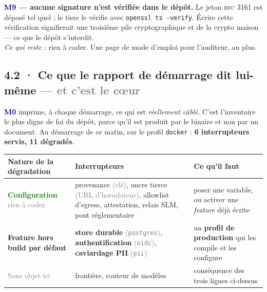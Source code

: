 \documentclass[10pt]{article}
\newcommand{\best}[1]{\textcolor{green}{\textbf{#1}}}
\newcommand{\moyen}[1]{\textcolor{amber}{\textbf{#1}}}
\newcommand{\sz}[1]{\textcolor{grey}{\small\textsf{#1}}}
\newcommand{\code}[1]{\texttt{\small #1}}
\newcommand{\mm}[1]{\textbf{\textcolor{navy}{#1}}}
\begin{document}
\textbf{\mm{M9} --- aucune signature n'est vérifiée dans le dépôt.} Le jeton \textsc{rfc 3161} est
déposé tel quel ; le tiers le vérifie avec \code{openssl ts -verify}. Écrire cette vérification
signifierait une troisième pile cryptographique et de la crypto maison --- ce que le dépôt s'interdit.
\\ \emph{Ce qui reste} : rien à coder. Une page de mode d'emploi pour l'auditeur, au plus.

\subsection{4.2 · Ce que le rapport de démarrage dit lui-même \sz{--- et c'est le cœur}}

\mm{M0} imprime, à chaque démarrage, ce qui est \emph{réellement câblé}. C'est l'inventaire le plus
digne de foi du dépôt, parce qu'il est produit par le binaire et non par un document. Au démarrage
de ce matin, sur le profil \code{docker} : \textbf{6 interrupteurs servis, 11 dégradés}.

\begin{center}\small
\renewcommand{\arraystretch}{1.2}
\begin{tabular}{@{}>{\raggedright\arraybackslash}p{4.3cm} >{\raggedright\arraybackslash}p{5.2cm} >{\raggedright\arraybackslash}p{6.0cm}@{}}
\toprule
\textbf{Nature de la dégradation} & \textbf{Interrupteurs} & \textbf{Ce qu'il faut} \\
\midrule
\best{Configuration} \sz{rien à coder} & provenance \sz{(clé)}, ancre tierce \sz{(URL d'horodateur)}, allowlist d'egress, attestation, relais SLM, pont réglementaire & poser une variable, ou activer une \emph{feature} déjà écrite \\
\moyen{Feature hors build par défaut} & \textbf{store durable} \sz{(\code{postgres})}, \textbf{authentification} \sz{(\code{oidc})}, \textbf{caviardage PII} \sz{(\code{pii})} & un \textbf{profil de production} qui les compile et les configure \\
\sz{Sans objet ici} & frontière, routeur de modèles & conséquence des trois lignes ci-dessus \\
\bottomrule
\end{tabular}
\end{center}
\end{document}
